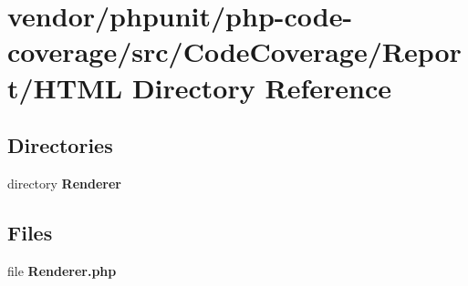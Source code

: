 \section{vendor/phpunit/php-\/code-\/coverage/src/\+Code\+Coverage/\+Report/\+H\+T\+M\+L Directory Reference}
\label{dir_b0e876d86f07136387c59edea03c14f5}
\subsection*{Directories}
\begin{DoxyCompactItemize}
\item 
directory {\bf Renderer}
\end{DoxyCompactItemize}
\subsection*{Files}
\begin{DoxyCompactItemize}
\item 
file {\bf Renderer.\+php}
\end{DoxyCompactItemize}
